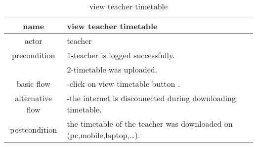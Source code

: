 \documentclass{article}
\begin{document}
    \begin{table}
    	\centering
    	\label{view teacher timetable}
    	\caption{view teacher timetable}
    	\begin{tabular}{|c|l|}
    		\hline
    		name & view teacher timetable\\
    		\hline
    		actor & teacher \\
    		\hline
    		precondition & 1-teacher is logged successfully.\\
    		&2-timetable was uploaded.\\
    		\hline
    		
    		basic flow & -click on view timetable button .\\
    		\hline
    		alternative flow & -the internet is disconnected during downloading timetable.\\
    		\hline
    		postcondition & the timetable of the teacher was downloaded on (pc,mobile,laptop,\ldots).\\
    		\hline
    	\end{tabular}
    \end{table}
    
\end{document}
